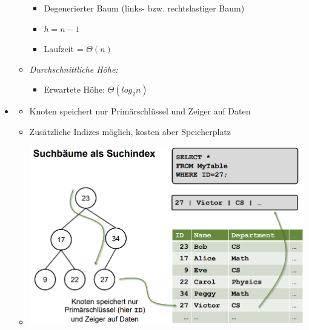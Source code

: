 \documentclass[
    12pt,
    a4paper,
    ngerman,
    color=3b,%
    marginpar=false,
    colorback=false,
    leqno,
]{tudaexercise}
\begin{document}
\begin{itemize}
\begin{itemize}
\begin{itemize}
                        \item Degenerierter Baum (links- bzw. rechtslastiger Baum)
                        \item $h = n - 1$
                        \item Laufzeit = $\Theta(n)$
                    \end{itemize}
              \item \textit{Durchschnittliche Höhe:}
                    \begin{itemize}
                        \item Erwartete Höhe: $\Theta(log_2 n)$
                    \end{itemize}
          \end{itemize}
    \item {}
          \begin{itemize}
              \item Knoten speichert nur Primärschlüssel und Zeiger auf Daten
              \item Zusätzliche Indizes möglich, kosten aber Speicherplatz
              \item[] \includegraphics[width=12cm]{pictures/suchbaumSuchindex.PNG}
          \end{itemize}
\end{itemize}
\pagebreak
\end{document}
